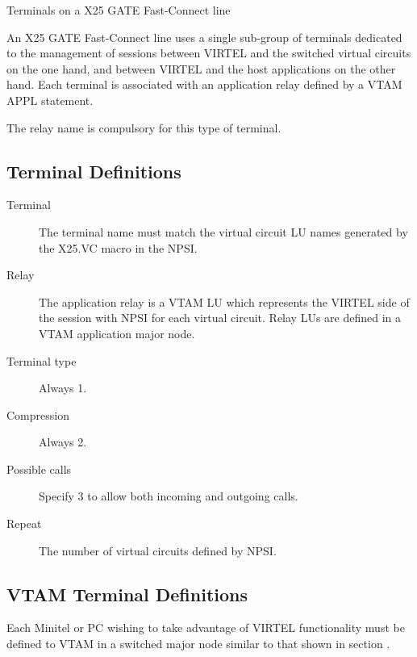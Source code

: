\documentclass[letterpaper,10pt,english]{sphinxmanual}
\begin{document}
Terminals on a X25 GATE Fast-Connect line

An X25 GATE Fast-Connect line uses a single sub-group of terminals dedicated to the management of sessions between VIRTEL and the switched virtual circuits on the one hand, and between VIRTEL and the host applications on the other hand. Each terminal is associated with an application relay defined by a VTAM APPL statement.

The relay name is compulsory for this type of terminal.



\subsection{Terminal Definitions}
\label{\detokenize{connectivity_guide:id32}}\label{\detokenize{connectivity_guide:index-70}}\begin{description}
\item[{Terminal}] \leavevmode
The terminal name must match the virtual circuit LU names generated
by the X25.VC macro in the NPSI.

\item[{Relay}] \leavevmode
The application relay is a VTAM LU which represents the VIRTEL side
of the session with NPSI for each virtual circuit. Relay LUs are
defined in a VTAM application major node.

\item[{Terminal type}] \leavevmode
Always 1.

\item[{Compression}] \leavevmode
Always 2.

\item[{Possible calls}] \leavevmode
Specify 3 to allow both incoming and outgoing calls.

\item[{Repeat}] \leavevmode
The number of virtual circuits defined by NPSI.

\end{description}


\subsection{VTAM Terminal Definitions}
\label{\detokenize{connectivity_guide:index-71}}\label{\detokenize{connectivity_guide:id33}}
Each Minitel or PC wishing to take advantage of VIRTEL functionality must be defined to VTAM in a switched major node similar to that shown in section {\hyperref[\detokenize{connectivity_guide:v457cn-x25gateline}]{}}.
\end{document}
